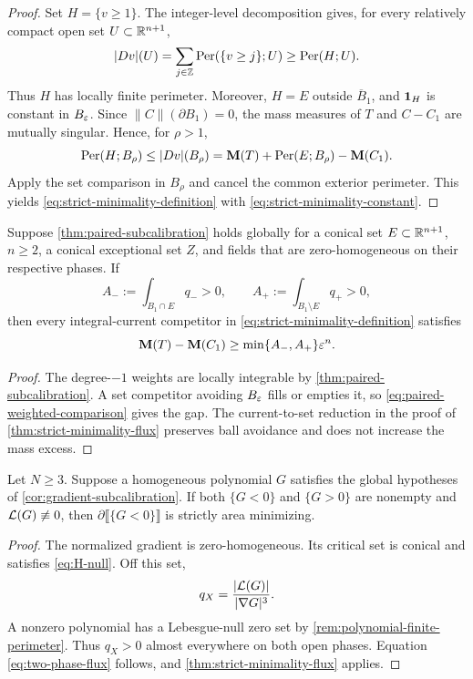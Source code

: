 \begin{proof}
Set \(H=\{v\geq1\}\). The integer-level decomposition
\cite[Theorem~27.6]{Simon83} gives, for every relatively compact
open set \(U\subset\mathbb R^{n+1}\),
\[
 |Dv|(U)=\sum_{j\in\mathbb Z}
       \operatorname{Per}(\{v\geq j\};U)
 \geq\operatorname{Per}(H;U).
\]
Thus \(H\) has locally finite perimeter. Moreover,
\(H=E\) outside \(\overline B_1\), and \(\mathbf 1_H\) is constant
in \(B_\varepsilon\).
Since \(\|C\|(\partial B_1)=0\), the mass measures of \(T\) and
\(C-C_1\) are mutually singular.  Hence, for \(\rho>1\),
\[
 \operatorname{Per}(H;B_\rho)\leq |Dv|(B_\rho)
 =\mathbf M(T)+\operatorname{Per}(E;B_\rho)-\mathbf M(C_1).
\]
Apply the set comparison in \(B_\rho\) and cancel the common exterior
perimeter.  This yields
\eqref{eq:strict-minimality-definition} with
\eqref{eq:strict-minimality-constant}.
\end{proof}


\begin{corollary}
\label{cor:paired-strict-minimality}
Suppose \cref{thm:paired-subcalibration} holds globally for a conical
set \(E\subset\mathbb R^{n+1}\), \(n\geq2\), a conical exceptional set \(Z\),
and fields that are zero-homogeneous on their respective phases.
If
\[
 A_-:=\int_{B_1\cap E}q_->0,\qquad
 A_+:=\int_{B_1\setminus E}q_+>0,
\]
then every integral-current competitor in
\eqref{eq:strict-minimality-definition} satisfies
\[
 \mathbf M(T)-\mathbf M(C_1)
 \geq\min\{A_-,A_+\}\varepsilon^n.
\]
\end{corollary}

\begin{proof}
The degree-\(-1\) weights are locally integrable by
\cref{thm:paired-subcalibration}. A set competitor avoiding \(B_\varepsilon\)
fills or empties it, so \eqref{eq:paired-weighted-comparison} gives the
gap. The current-to-set reduction in the proof of
\cref{thm:strict-minimality-flux} preserves ball avoidance and does
not increase the mass excess.
\end{proof}

\begin{corollary}
\label{cor:polynomial-strict-minimality}
Let \(N\geq3\).  Suppose a homogeneous polynomial \(G\) satisfies the global hypotheses of
\cref{cor:gradient-subcalibration}.  If both \(\{G<0\}\) and \(\{G>0\}\)
are nonempty and \(\mathcal L(G)\not\equiv0\), then
\(\partial\llbracket\{G<0\}\rrbracket\) is strictly area minimizing.
\end{corollary}

\begin{proof}
The normalized gradient is zero-homogeneous.  Its critical set is
conical and satisfies \eqref{eq:H-null}.  Off this set,
\[
 q_X=\frac{|\mathcal L(G)|}{|\nabla G|^3}.
\]
A nonzero polynomial has a Lebesgue-null zero set
by \cref{rem:polynomial-finite-perimeter}. Thus \(q_X>0\) almost everywhere on both open
phases.  Equation \eqref{eq:two-phase-flux} follows, and
\cref{thm:strict-minimality-flux} applies.
\end{proof}

